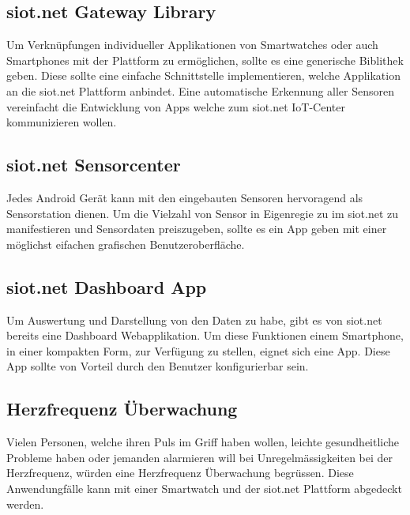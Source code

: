 \subsection{siot.net Gateway Library}
Um Verknüpfungen individueller Applikationen von Smartwatches oder auch Smartphones mit der Plattform zu ermöglichen, sollte es eine generische Biblithek geben. Diese sollte eine einfache Schnittstelle implementieren, welche Applikation an die siot.net Plattform anbindet. Eine automatische Erkennung aller Sensoren vereinfacht die Entwicklung von Apps welche zum siot.net IoT-Center kommunizieren wollen.

\subsection{siot.net Sensorcenter}
Jedes Android Gerät kann mit den eingebauten Sensoren hervoragend als Sensorstation dienen. Um die Vielzahl von Sensor in Eigenregie zu im siot.net zu manifestieren und Sensordaten preiszugeben, sollte es ein App geben mit einer möglichst eifachen grafischen Benutzeroberfläche.

\subsection{siot.net Dashboard App}
Um Auswertung und Darstellung von den Daten zu habe, gibt es von siot.net bereits eine Dashboard Webapplikation. Um diese Funktionen einem Smartphone, in einer kompakten Form, zur Verfügung zu stellen, eignet sich eine App. Diese App sollte von Vorteil durch den Benutzer konfigurierbar sein.

\subsection{Herzfrequenz Überwachung}
Vielen Personen, welche ihren Puls im Griff haben wollen, leichte gesundheitliche Probleme haben oder jemanden alarmieren will bei Unregelmässigkeiten bei der Herzfrequenz, würden eine Herzfrequenz Überwachung begrüssen. Diese Anwendungfälle kann mit einer Smartwatch und der siot.net Plattform abgedeckt werden.

